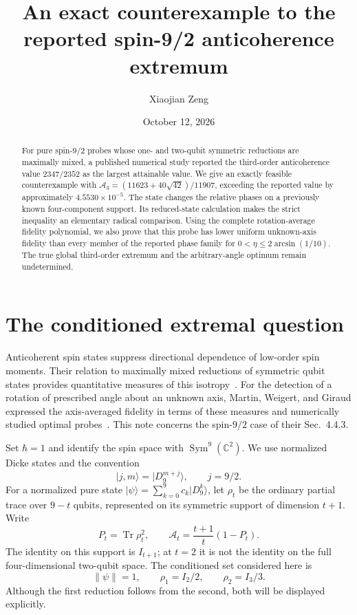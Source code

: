 \documentclass[aps,pra,reprint,onecolumn,notitlepage,longbibliography]{revtex4-2}
\newcommand{\ket}[1]{\lvert #1\rangle}
\newcommand{\tr}{\operatorname{Tr}}
\newcommand{\sym}{\operatorname{Sym}}
\newcommand{\A}{\mathcal A}
\begin{document}
\title{An exact counterexample to the reported spin-9/2 anticoherence extremum}
\author{Xiaojian Zeng}
\date{October 12, 2026}
\begin{abstract}
For pure spin-$9/2$ probes whose one- and two-qubit symmetric reductions are maximally mixed, a published numerical study reported the third-order anticoherence value $2347/2352$ as the largest attainable value. We give an exactly feasible counterexample with $\A_3=(11623+40\sqrt{42})/11907$, exceeding the reported value by approximately $4.5530\times10^{-5}$. The state changes the relative phases on a previously known four-component support. Its reduced-state calculation makes the strict inequality an elementary radical comparison. Using the complete rotation-average fidelity polynomial, we also prove that this probe has lower uniform unknown-axis fidelity than every member of the reported phase family for $0<\eta\leq2\arcsin(1/10)$. The true global third-order extremum and the arbitrary-angle optimum remain undetermined.
\end{abstract}
\maketitle

\section{The conditioned extremal question}
Anticoherent spin states suppress directional dependence of low-order spin moments. Their relation to maximally mixed reductions of symmetric qubit states provides quantitative measures of this isotropy~\cite{Baguette2017}. For the detection of a rotation of prescribed angle about an unknown axis, Martin, Weigert, and Giraud expressed the axis-averaged fidelity in terms of these measures and numerically studied optimal probes~\cite{Martin2020}. This note concerns the spin-$9/2$ case of their Sec.~4.4.3.

Set $\hbar=1$ and identify the spin space with $\sym^9(\mathbb C^2)$. We use normalized Dicke states and the convention
\begin{equation}
 \ket{j,m}=\ket{D_9^{m+j}},\qquad j=9/2.
 \label{eq:convention}
\end{equation}
For a normalized pure state $\ket\psi=\sum_{k=0}^9c_k\ket{D_9^k}$, let $\rho_t$ be the ordinary partial trace over $9-t$ qubits, represented on its symmetric support of dimension $t+1$. Write
\begin{equation}
 P_t=\tr\rho_t^2,\qquad
 \A_t=\frac{t+1}{t}(1-P_t).
 \label{eq:measure}
\end{equation}
The identity on this support is $I_{t+1}$; at $t=2$ it is not the identity on the full four-dimensional two-qubit space. The conditioned set considered here is
\begin{equation}
 \|\psi\|=1,\qquad \rho_1=I_2/2,\qquad \rho_2=I_3/3.
 \label{eq:constraints}
\end{equation}
Although the first reduction follows from the second, both will be displayed explicitly.
\end{document}
